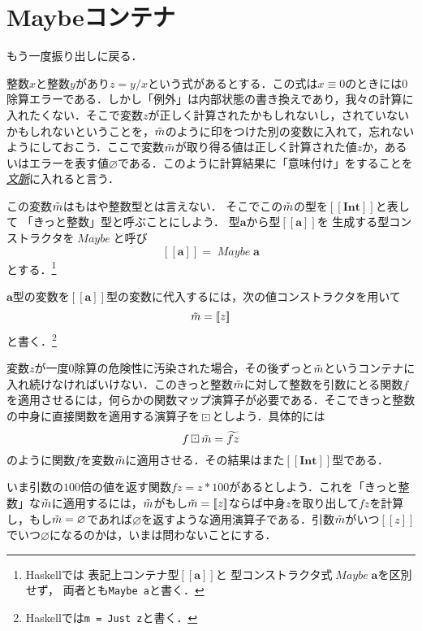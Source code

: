 \documentclass[a5paper,draft]{jsbook}
\def\[{\left[\!\left[}
\def\]{\right]\!\right]}
\newcommand{\programminglanguage}[1]{\textsf{#1}}
\newcommand{\haskell}{\programminglanguage{Haskell}}
\newcommand{\keyword}[1]{{\underline{\emph{#1}}}}
\newcommand{\code}[1]{\texttt{#1}}
\newcommand{\mathTypeParameter}[1]{\mathbf{#1}}
\newcommand{\mathTypeName}[1]{\textbf{#1}}
\newcommand{\hsklTypeParameterConstructor}[1]{\textit{#1}}
\newcommand{\mathTypeConstructor}[1]{\textit{#1}} %
\newcommand{\mathMaybeType}[1]{\[#1\]}
\DeclareMathOperator{\mathMaybe}{\mathTypeConstructor{Maybe}}
\DeclareMathOperator{\hsklMaybeConstructor}{\hsklTypeParameterConstructor{Maybe}}
\DeclareMathOperator{\hsklMaybeMap}{\boxdot}
\newcommand{\hsklNothing}{\varnothing}
\newcommand{\hsklJust}[1]{\[#1\]}
\newcommand{\hsklMaybeType}[1]{\[#1\]}
\newcommand{\hsklMaybe}[1]{\Tilde{#1}}
\newcommand{\hsklMaybeW}[1]{\widetilde{#1}}
\begin{document}
\section{Maybeコンテナ}

もう一度振り出しに戻る．

整数$x$と整数$y$があり$z=y/x$という式があるとする．この式は$x\equiv0$のときには$0$除算エラーである．しかし「例外」は内部状態の書き換えであり，我々の計算に入れたくない．そこで変数$z$が正しく計算されたかもしれないし，されていないかもしれないということを，$\hsklMaybe{m}$のように印をつけた別の変数に入れて，忘れないようにしておこう．ここで変数$\hsklMaybe{m}$が取り得る値は正しく計算された値$z$か，あるいはエラーを表す値$\hsklNothing$である．このように計算結果に「意味付け」をすることを\keyword{文脈}に入れると言う．

この変数$\hsklMaybe{m}$はもはや整数型とは言えない．
そこでこの$\hsklMaybe{m}$の型を$\hsklMaybeType{\mathTypeName{Int}}$と表して
「きっと整数」型と呼ぶことにしよう．
型$\mathTypeParameter{a}$から型$\mathMaybeType{\mathTypeParameter{a}}$を
生成する型コンストラクタを$\hsklMaybeConstructor$と呼び
$$
\mathMaybeType{\mathTypeParameter{a}}
=\mathMaybe\mathTypeParameter{a}
$$
とする．\footnote{\haskell では
表記上コンテナ型$\mathMaybeType{\mathTypeParameter{a}}$と
型コンストラクタ式$\mathMaybe\mathTypeParameter{a}$を区別せず，
両者とも\code{Maybe a}と書く．}

$\mathTypeParameter{a}$型の変数を$\hsklMaybeType{\mathTypeParameter{a}}$型の変数に代入するには，次の値コンストラクタを用いて$$\hsklMaybe{m}=\hsklJust{z}$$と書く．\footnote{\haskell では\code{m = Just z}と書く．}

変数$z$が一度$0$除算の危険性に汚染された場合，その後ずっと$\hsklMaybe{m}$というコンテナに入れ続けなければいけない．このきっと整数$\hsklMaybe{m}$に対して整数を引数にとる関数$f$を適用させるには，何らかの関数マップ演算子が必要である．そこできっと整数の中身に直接関数を適用する演算子を$\hsklMaybeMap$としよう．具体的には$$f\hsklMaybeMap\hsklMaybe{m}=\hsklMaybeW{fz}$$のように関数$f$を変数$\hsklMaybe{m}$に適用させる．その結果はまた$\hsklMaybeType{\mathTypeName{Int}}$型である．

いま引数の$100$倍の値を返す関数$fz=z*100$があるとしよう．これを「きっと整数」な$\hsklMaybe{m}$に適用するには，$\hsklMaybe{m}$がもし$\hsklMaybe{m}=\hsklJust{z}$ならば中身$z$を取り出して$fz$を計算し，もし$\hsklMaybe{m}=\hsklNothing$であれば$\hsklNothing$を返すような適用演算子である．引数$\hsklMaybe{m}$がいつ$\hsklJust{z}$でいつ$\hsklNothing$になるのかは，いまは問わないことにする．
\end{document}
